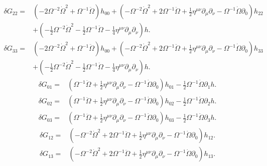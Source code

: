 \documentclass[10pt,letterpaper]{article}
\begin{document}
\begin{align}
\delta G_{22}={}&(-2 \Omega^{-2} \dot{\Omega}^2
 + \Omega^{-1} \ddot{\Omega}) h_{00}
 + (- \Omega^{-2} \dot{\Omega}^2
 + 2 \Omega^{-1} \ddot{\Omega}
 + \tfrac{1}{2} \eta^{\mu \nu} \partial_{\mu} \partial_{\nu}
 -  \Omega^{-1} \dot{\Omega} \partial_{0}) h_{22}\nonumber\\
& + (- \tfrac{1}{2} \Omega^{-2} \dot{\Omega}^2
 -  \tfrac{1}{2} \Omega^{-1} \ddot{\Omega}
 -  \tfrac{1}{4} \eta^{\mu \nu} \partial_{\mu} \partial_{\nu}) h.
\end{align}
\begin{align}
\delta G_{33}={}&(-2 \Omega^{-2} \dot{\Omega}^2
 + \Omega^{-1} \ddot{\Omega}) h_{00}
 + (- \Omega^{-2} \dot{\Omega}^2
 + 2 \Omega^{-1} \ddot{\Omega}
 + \tfrac{1}{2} \eta^{\mu \nu} \partial_{\mu} \partial_{\nu}
 -  \Omega^{-1} \dot{\Omega} \partial_{0}) h_{33}\nonumber\\
& + (- \tfrac{1}{2} \Omega^{-2} \dot{\Omega}^2
 -  \tfrac{1}{2} \Omega^{-1} \ddot{\Omega}
 -  \tfrac{1}{4} \eta^{\mu \nu} \partial_{\mu} \partial_{\nu}) h.
\end{align}
\begin{align}
\delta G_{01}={}&(\Omega^{-1} \ddot{\Omega}
 + \tfrac{1}{2} \eta^{\mu \nu} \partial_{\mu} \partial_{\nu}
 -  \Omega^{-1} \dot{\Omega} \partial_{0}) h_{01}
 -  \tfrac{1}{2} \Omega^{-1} \dot{\Omega} \partial_{1} h.
\end{align}
\begin{align}
\delta G_{02}={}&(\Omega^{-1} \ddot{\Omega}
 + \tfrac{1}{2} \eta^{\mu \nu} \partial_{\mu} \partial_{\nu}
 -  \Omega^{-1} \dot{\Omega} \partial_{0}) h_{02}
 -  \tfrac{1}{2} \Omega^{-1} \dot{\Omega} \partial_{2} h.
\end{align}
\begin{align}
\delta G_{03}={}&(\Omega^{-1} \ddot{\Omega}
 + \tfrac{1}{2} \eta^{\mu \nu} \partial_{\mu} \partial_{\nu}
 -  \Omega^{-1} \dot{\Omega} \partial_{0}) h_{03}
 -  \tfrac{1}{2} \Omega^{-1} \dot{\Omega} \partial_{3} h.
\end{align}
\begin{align}
\delta G_{12}={}&(- \Omega^{-2} \dot{\Omega}^2
 + 2 \Omega^{-1} \ddot{\Omega}
 + \tfrac{1}{2} \eta^{\mu \nu} \partial_{\mu} \partial_{\nu}
 -  \Omega^{-1} \dot{\Omega} \partial_{0}) h_{12}.
\end{align}
\begin{align}
\delta G_{13}={}&(- \Omega^{-2} \dot{\Omega}^2
 + 2 \Omega^{-1} \ddot{\Omega}
 + \tfrac{1}{2} \eta^{\mu \nu} \partial_{\mu} \partial_{\nu}
 -  \Omega^{-1} \dot{\Omega} \partial_{0}) h_{13}.
\end{align}
\end{document}
